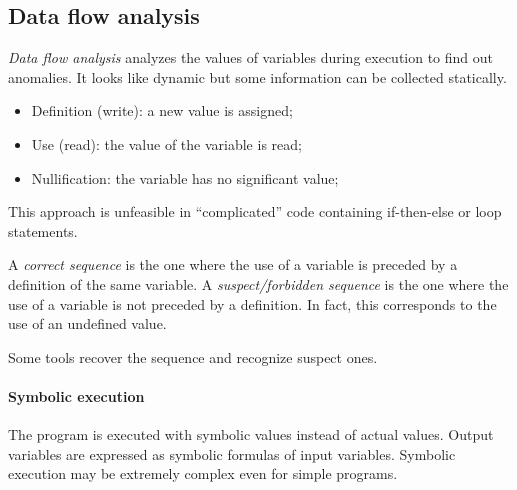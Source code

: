 \subsection{Data flow analysis}
\emph{Data flow analysis} analyzes the values of variables during execution to find out anomalies. It looks like dynamic but some information can be collected statically.
\begin{itemize}
\item Definition (write): a new value is assigned;
\item Use (read): the value of the variable is read;
\item Nullification: the variable has no significant value;
\end{itemize}
This approach is unfeasible in ``complicated'' code containing if-then-else or loop statements.

A \emph{correct sequence} is the one where the use of a variable is preceded by a definition of the same variable. A \emph{suspect/forbidden sequence} is the one where the use of a variable is not preceded by a definition. In fact, this corresponds to the use of an undefined value.

Some tools recover the sequence and recognize suspect ones.

\paragraph{Symbolic execution}
The program is executed with symbolic values instead of actual values. Output variables are expressed as symbolic formulas of input variables. Symbolic execution may be extremely complex even for simple programs.